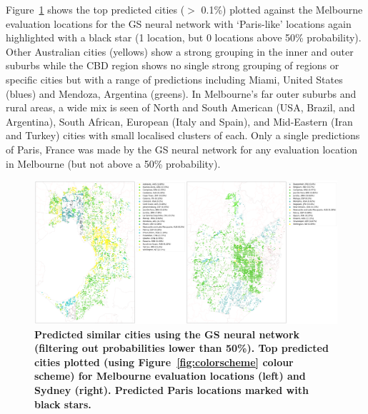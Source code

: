 \documentclass[Crown,sageh,times]{sagej}
\begin{document}
Figure~\ref{fig:melsat} shows the top predicted cities ($>$ 0.1\%) plotted against the Melbourne evaluation locations for the GS neural network with `Paris-like' locations again highlighted with a black star (1 location, but 0 locations above 50\% probability). Other Australian cities (yellows) show a strong grouping in the inner and outer suburbs while the CBD region shows no single strong grouping of regions or specific cities but with a range of predictions including Miami, United States (blues) and Mendoza, Argentina (greens). In Melbourne's far outer suburbs and rural areas, a wide mix is seen of North and South American (USA, Brazil, and Argentina), South African, European (Italy and Spain), and Mid-Eastern (Iran and Turkey) cities with small localised clusters of each. Only a single predictions of Paris, France was made by the GS neural network for any evaluation location in Melbourne (but not above a 50\% probability).




\begin{figure}[!htbp]
\centering   
\includegraphics[scale=0.10]{Images/Figure5GS.png}  
\caption{ \bf Predicted similar cities using the GS neural network (filtering out probabilities lower than 50\%). Top predicted cities plotted (using Figure~\ref{fig:colorscheme} colour scheme) for Melbourne evaluation locations (left) and Sydney (right). Predicted Paris locations marked with black stars.}    
 \label{fig:melsat}  
\end{figure} 
\end{document}
